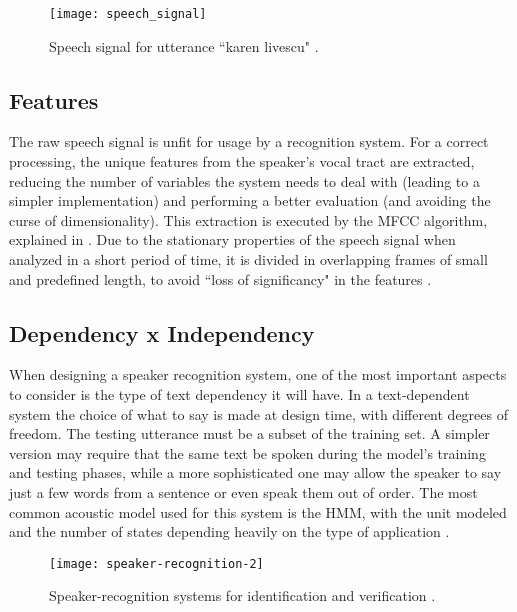 \begin{figure}[ht]
    \centering
    \texttt{[image: speech\_signal]}
    \caption{Speech signal for utterance ``karen livescu" \cite{woo.park.hazen.2006}.}
    \label{fig:speech_signal}
\end{figure}

\subsection{Features}

The raw speech signal is unfit for usage by a recognition system. For a correct processing, the unique features from the speaker's vocal tract are extracted, reducing the number of variables the system needs to deal with (leading to a simpler implementation) and performing a better evaluation (and avoiding the curse of dimensionality). This extraction is executed by the MFCC algorithm, explained in . Due to the stationary properties of the speech signal when analyzed in a short period of time, it is divided in overlapping frames of small and predefined length, to avoid ``loss of significancy" in the features \cite{davis.mermelstein.1980, rabiner.schafer.2007}.

\subsection{Dependency x Independency}

When designing a speaker recognition system, one of the most important aspects to consider is the type of text dependency it will have. In a text-dependent system the choice of what to say is made at design time, with different degrees of freedom. The testing utterance must be a subset of the training set. A simpler version may require that the same text be spoken during the model's training and testing phases, while a more sophisticated one may allow the speaker to say just a few words from a sentence or even speak them out of order. The most common acoustic model used for this system is the HMM, with the unit modeled and the number of states depending heavily on the type of application \cite{hebert.2008}.

\begin{figure}[ht]
    \centering
    \texttt{[image: speaker-recognition-2]}
    \caption{Speaker-recognition systems for identification and verification \cite{reynolds.1995}.}
    \label{fig:speaker-recognition-2}
\end{figure}

